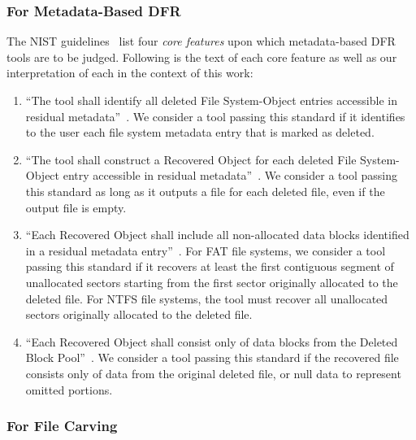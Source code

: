 \subsubsection{For Metadata-Based DFR}
\begin{paraphrase}
 The NIST guidelines~\cite{meta:dfr:standards} list four \emph{core features} upon which metadata-based DFR tools are to be judged.
Following is the text of each core feature as well as our interpretation of each in the context of this work:
\begin{enumerate}
 \item ``The tool shall identify all deleted File System-Object entries accessible in residual metadata''~\cite{meta:dfr:standards}.
 We consider a tool passing this standard if it identifies to the user each file system metadata entry that is marked as deleted.
 \item ``The tool shall construct a Recovered Object for each deleted File System-Object entry accessible in residual metadata''~\cite{meta:dfr:standards}.
 We consider a tool passing this standard as long as it outputs a file for each deleted file, even if the output file is empty.
 \item ``Each Recovered Object shall include all non-allocated data blocks identified in a residual metadata entry''~\cite{meta:dfr:standards}.
 For FAT file systems, we consider a tool passing this standard if it recovers at least the first contiguous segment of unallocated sectors starting 
from the first sector originally allocated to the deleted file. For NTFS file systems, the tool must recover all unallocated sectors originally allocated to the deleted file.
 \item ``Each Recovered Object shall consist only of data blocks from the Deleted Block Pool''~\cite{meta:dfr:standards}.
 We consider a tool passing this standard if the recovered file consists only of data from the original deleted file, or null data to represent omitted portions.
\end{enumerate}
\end{paraphrase}

\subsubsection{For File Carving}

